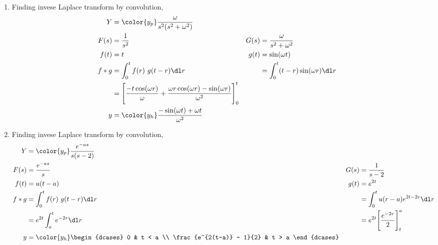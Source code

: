 \begin{enumerate}
    \item Finding invese Laplace transform by convolution,
          \begin{align}
              Y     & = \color{y_p} \frac{\omega}{s^2(s^2 + \omega^2)}            \\
              F(s)  & = \frac{1}{s^2}                                           &
              G(s)  & = \frac{\omega}{s^2 + \omega^2}                             \\
              f(t)  & = t                                                       &
              g(t)  & = \sin(\omega t)                                            \\
              f * g & = \int_{0}^{t} f(r)\ g(t-r) \dl r                         &
                    & = \int_{0}^{t} (t - r)\sin(\omega r) \dl r                  \\
                    & = \Bigg[ \frac{-t\cos(\omega r)}{\omega}
                  + \frac{\omega r \cos(\omega r) - \sin(\omega r)}{\omega^2}
              \Bigg]_0^t                                                          \\
              y     & = \color{y_h} \frac{-\sin(\omega t) + \omega t}{\omega^2}
          \end{align}

    \item Finding invese Laplace transform by convolution,
          \begin{align}
              Y     & = \color{y_p} \frac{e^{-as}}{s(s - 2)}         \\
              F(s)  & = \frac{e^{-as}}{s}                          &
              G(s)  & = \frac{1}{s - 2}                              \\
              f(t)  & = u(t-a)                                     &
              g(t)  & = e^{2t}                                       \\
              f * g & = \int_{0}^{t} f(r)\ g(t-r) \dl r            &
                    & = \int_{0}^{t} u(r - a) e^{2t - 2r} \dl r      \\
                    & = e^{2t}\int_{a}^{t} e^{-2r} \dl r           &
                    & = e^{2t} \Bigg[ \frac{e^{-2r}}{2} \Bigg]_t^a   \\
              y     & = \color{y_h}
              \begin{dcases}
                  0                        & t < a \\
                  \frac{e^{2(t-a)} - 1}{2} & t > a
              \end{dcases}
          \end{align}


\end{enumerate}
